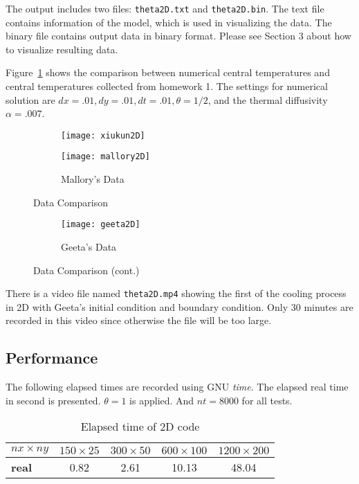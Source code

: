 \documentclass[letterpaper,12pt,fleqn]{article}
\begin{document}
The output includes two files: \texttt{theta2D.txt} and \texttt{theta2D.bin}.
The text file contains information of the model, which is used in visualizing the data.
The binary file contains output data in binary format.
Please see Section 3 about how to visualize resulting data.

Figure~\ref{fig:data-comp-2d} shows the comparison between numerical central temperatures and central temperatures collected from homework 1.
The settings for numerical solution are $dx=.01, dy=.01, dt=.01, \theta=1/2$, and the thermal diffusivity $\alpha=.007$.

\begin{figure}[H]
  \begin{subfigure}[b]{\textwidth}
    \centering
    \texttt{[image: xiukun2D]}
  \end{subfigure}
  \begin{subfigure}[b]{\textwidth}
    \centering
    \texttt{[image: mallory2D]}
    \caption{Mallory's Data}
  \end{subfigure}
  \caption{Data Comparison}
\end{figure}

\begin{figure}[H]\ContinuedFloat
  \begin{subfigure}[b]{\textwidth}
    \centering
    \texttt{[image: geeta2D]}
    \caption{Geeta's Data}
  \end{subfigure}
  \caption{Data Comparison (cont.)}
  \label{fig:data-comp-2d}
\end{figure}

There is a video file named \texttt{theta2D.mp4} showing the first of the cooling process in 2D with Geeta's initial condition and boundary condition.
Only 30 minutes are recorded in this video since otherwise the file will be too large.

\subsection{Performance}
The following elapsed times are recorded using GNU \textit{time}. 
The elapsed real time in second is presented.
$\theta=1$ is applied. And $nt=8000$ for all tests.

\begin{table}[H]
  \centering
  \begin{tabular}{l c c c c }
    \toprule
    \textbf{$nx\times ny$} & $150\times 25$ & $300\times 50$ & $600\times 100$ & $1200\times 200$\\
    \midrule
    \textbf{real} & 0.82 & 2.61 & 10.13 & 48.04\\
    \bottomrule
  \end{tabular}
  \caption{Elapsed time of 2D code}
  \label{tab:time-2d}
\end{table}
\end{document}
